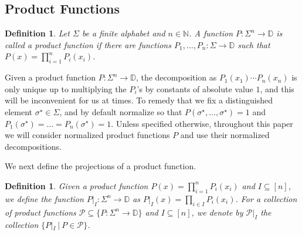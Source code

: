 \documentclass[11pt]{article}
\newtheorem{definition}[thm]{Definition}
\begin{document}
\subsection{Product Functions}
\begin{definition}
    Let $\Sigma$ be a finite alphabet and $n\in\mathbb{N}$. A function $P\colon \Sigma^n\to\mathbb{D}$ is called a product function if there are functions $P_1,\ldots,P_n\colon \Sigma\to\mathbb{D}$ such that $P(x) = \prod\limits_{i=1}^{n}P_i(x_i)$.
\end{definition}
Given a product function $P\colon \Sigma^{n}\to\mathbb{D}$, the decomposition as $P_1(x_1)\cdots P_n(x_n)$ is only unique up to multiplying the $P_i$'s by constants of absolute value $1$, and this will be inconvenient for us at times. To remedy that we fix a distinguished element $\sigma^{\star}\in \Sigma$, and by default normalize so that $P(\sigma^{\star},\ldots,\sigma^{\star}) = 1$ and $P_1(\sigma^{\star})=\ldots=P_{n}(\sigma^{\star})=1$. Unless specified otherwise, throughout this paper we will consider normalized product functions $P$ and use their normalized decompositions.

We next define the projections of a product function.
\begin{definition}
    Given a product function $P(x) = \prod\limits_{i=1}^{n}P_i(x_i)$ and $I\subseteq [n]$, we define the function $P|_{I}\colon \Sigma^n\to\mathbb{D}$ as 
    $P|_{I}(x) = \prod\limits_{i\in I}P_i(x_i)$. For a collection of product functions $\mathcal{P}\subseteq \{P\colon \Sigma^n\to\mathbb{D}\}$ and $I\subseteq [n]$, we denote by 
    $\mathcal{P}|_{I}$ the collection $\{P|_{I}~|~P\in\mathcal{P}\}$.
\end{definition}
\end{document}
